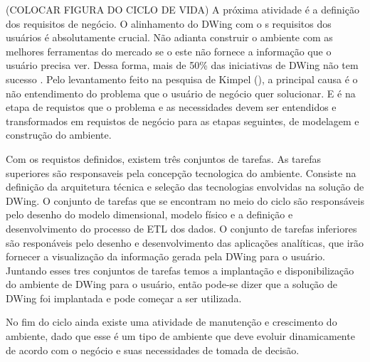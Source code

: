 (COLOCAR FIGURA DO CICLO DE VIDA)
%
A próxima atividade é a definição dos requisitos de negócio. O alinhamento do DWing com o s requisitos dos usuários é absolutamente crucial. Não adianta construir o ambiente com as melhores ferramentas do mercado se o este não fornece a informação que o usuário precisa ver. Dessa forma, mais de 50\% das iniciativas de DWing não tem sucesso \cite{sen2011}. Pelo levantamento feito na pesquisa de Kimpel (\citeyear{kimpel2013}), a principal causa é o não entendimento do problema que o usuário de negócio quer solucionar. E é na etapa de requistos que o problema e as necessidades devem ser entendidos e transformados em requistos de negócio para as etapas seguintes, de modelagem e construção do ambiente.

%

Com os requistos definidos, existem três conjuntos de tarefas. As tarefas superiores são responsaveis pela concepção tecnologica do ambiente. Consiste na definição da arquitetura técnica e  seleção das tecnologias envolvidas na solução de DWing. O conjunto de tarefas que se encontram no meio do ciclo são responsáveis pelo desenho do modelo dimensional, modelo físico e a definição e desenvolvimento do processo de ETL dos dados. O conjunto de tarefas inferiores são responáveis pelo desenho e desenvolvimento das aplicações analíticas, que irão fornecer a visualização da informação gerada pela DWing para o usuário. Juntando esses tres conjuntos de tarefas temos a implantação e disponibilização do ambiente de DWing para o usuário, então pode-se dizer que a solução de DWing foi implantada e pode começar a ser utilizada. 

%

No fim do ciclo ainda existe uma atividade de manutenção e crescimento do ambiente, dado que esse é um tipo de ambiente que deve evoluir dinamicamente de acordo com o negócio e suas necessidades de tomada de decisão.
